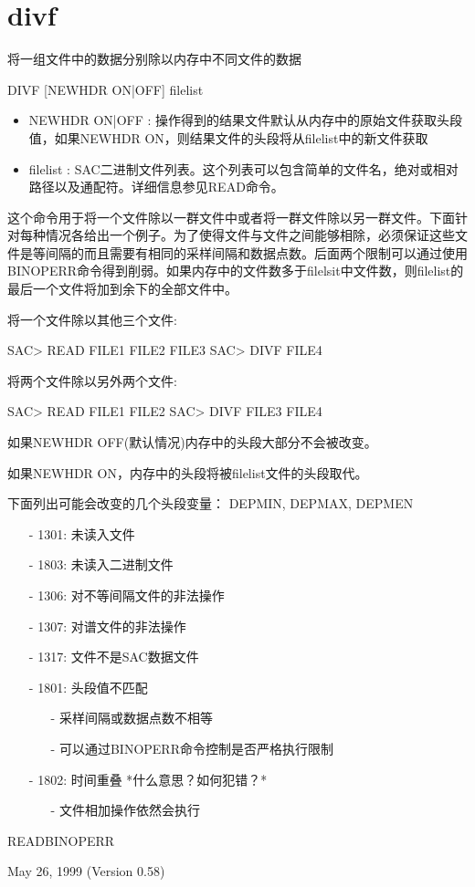 \section{divf}
\label{cmd:divf}

将一组文件中的数据分别除以内存中不同文件的数据

DIVF [NEWHDR ON|OFF] filelist

\begin{itemize}
\item NEWHDR ON|OFF : 操作得到的结果文件默认从内存中的原始文件获取头段值，如果NEWHDR ON，则结果文件的头段将从filelist中的新文件获取 
\item filelist : SAC二进制文件列表。这个列表可以包含简单的文件名，绝对或相对路径以及通配符。详细信息参见READ命令。
\end{itemize}

这个命令用于将一个文件除以一群文件中或者将一群文件除以另一群文件。下面针对每种情况各给出一个例子。为了使得文件与文件之间能够相除，必须保证这些文件是等间隔的而且需要有相同的采样间隔和数据点数。后面两个限制可以通过使用BINOPERR命令得到削弱。如果内存中的文件数多于filelsit中文件数，则filelist的最后一个文件将加到余下的全部文件中。

将一个文件除以其他三个文件:
\begin{SACCode}
SAC> READ FILE1 FILE2 FILE3
SAC> DIVF FILE4
\end{SACCode}
将两个文件除以另外两个文件:
\begin{SACCode}
SAC> READ FILE1 FILE2
SAC> DIVF FILE3 FILE4
\end{SACCode}

如果NEWHDR OFF(默认情况)内存中的头段大部分不会被改变。

如果NEWHDR ON，内存中的头段将被filelist文件的头段取代。

下面列出可能会改变的几个头段变量：
DEPMIN, DEPMAX, DEPMEN

\begin{itemize}
\item[-]1301: 未读入文件
\item[-]1803: 未读入二进制文件
\item[-]1306: 对不等间隔文件的非法操作
\item[-]1307: 对谱文件的非法操作
\item[-]1317: 文件不是SAC数据文件
\item[-]1801: 头段值不匹配
	\begin{itemize}
	\item[-]采样间隔或数据点数不相等
	\item[-]可以通过BINOPERR命令控制是否严格执行限制
	\end{itemize}
\end{itemize}

\begin{itemize}
\item[-]1802: 时间重叠  *什么意思？如何犯错？*
	\begin{itemize}
	\item[-]文件相加操作依然会执行
	\end{itemize}
\end{itemize}

READBINOPERR

May 26, 1999 (Version 0.58)
